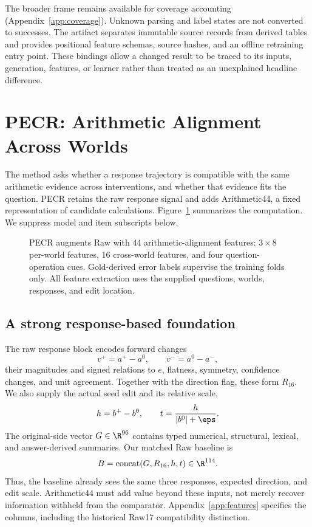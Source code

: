 The broader frame remains available for coverage accounting (Appendix~\ref{app:coverage}). Unknown parsing and label states are not converted to successes. The artifact separates immutable source records from derived tables and provides positional feature schemas, source hashes, and an offline retraining entry point. These bindings allow a changed result to be traced to its inputs, generation, features, or learner rather than treated as an unexplained headline difference.

\section{PECR: Arithmetic Alignment Across Worlds}
\label{sec:method}
The method asks whether a response trajectory is compatible with the same arithmetic evidence across interventions, and whether that evidence fits the question. PECR retains the raw response signal and adds Arithmetic44, a fixed representation of candidate calculations. Figure~\ref{fig:method} summarizes the computation. We suppress model and item subscripts below.

\begin{figure}[t]
\centering
{}
\caption{PECR augments Raw with 44 arithmetic-alignment features: $3\times8$ per-world features, 16 cross-world features, and four question-operation cues. Gold-derived error labels supervise the training folds only. All feature extraction uses the supplied questions, worlds, responses, and edit location.}
\label{fig:method}
\end{figure}

\subsection{A strong response-based foundation}
The raw response block encodes forward changes
\begin{equation}
 v^+=a^+-a^0,\qquad v^-=a^0-a^-,
\end{equation}
their magnitudes and signed relations to $e$, flatness, symmetry, confidence changes, and unit agreement. Together with the direction flag, these form $R_{16}$. We also supply the actual seed edit and its relative scale,
\begin{equation}
 h=b^+-b^0,\qquad t=\frac{h}{|b^0|+\eps}.
\end{equation}
The original-side vector $G\in\R^{96}$ contains typed numerical, structural, lexical, and answer-derived summaries. Our matched Raw baseline is
\begin{equation}
 B=\operatorname{concat}(G,R_{16},h,t)\in\R^{114}.
 \label{eq:raw}
\end{equation}
Thus, the baseline already sees the same three responses, expected direction, and edit scale. Arithmetic44 must add value beyond these inputs, not merely recover information withheld from the comparator. Appendix~\ref{app:features} specifies the columns, including the historical Raw17 compatibility distinction.


